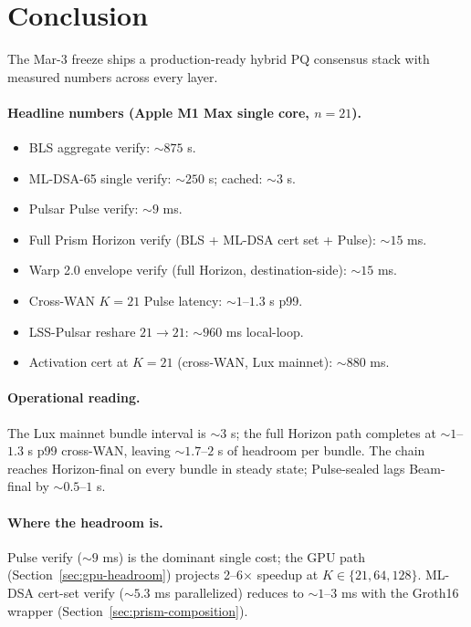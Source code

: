 \section{Conclusion}
\label{sec:bench-conclusion}

The Mar-3 freeze ships a production-ready hybrid PQ consensus stack with measured numbers across every layer.

\paragraph{Headline numbers (Apple M1 Max single core, $n = 21$).}
\begin{itemize}[leftmargin=2em,nosep]
  \item BLS aggregate verify: $\sim 875$ \textmu s.
  \item ML-DSA-65 single verify: $\sim 250$ \textmu s; cached: $\sim 3$ \textmu s.
  \item Pulsar Pulse verify: $\sim 9$ ms.
  \item Full Prism Horizon verify (BLS + ML-DSA cert set + Pulse): $\sim 15$ ms.
  \item Warp 2.0 envelope verify (full Horizon, destination-side): $\sim 15$ ms.
  \item Cross-WAN $K = 21$ Pulse latency: $\sim 1$--$1.3$ s p99.
  \item LSS-Pulsar reshare $21 \to 21$: $\sim 960$ ms local-loop.
  \item Activation cert at $K = 21$ (cross-WAN, Lux mainnet): $\sim 880$ ms.
\end{itemize}

\paragraph{Operational reading.} The Lux mainnet bundle interval is $\sim 3$ s; the full Horizon path completes at $\sim 1$--$1.3$ s p99 cross-WAN, leaving $\sim 1.7$--$2$ s of headroom per bundle. The chain reaches Horizon-final on every bundle in steady state; Pulse-sealed lags Beam-final by $\sim 0.5$--$1$ s.

\paragraph{Where the headroom is.} Pulse verify ($\sim 9$ ms) is the dominant single cost; the GPU path (Section~\ref{sec:gpu-headroom}) projects 2--6$\times$ speedup at $K \in \{21, 64, 128\}$. ML-DSA cert-set verify ($\sim 5.3$ ms parallelized) reduces to $\sim 1$--$3$ ms with the Groth16 wrapper (Section~\ref{sec:prism-composition}).

